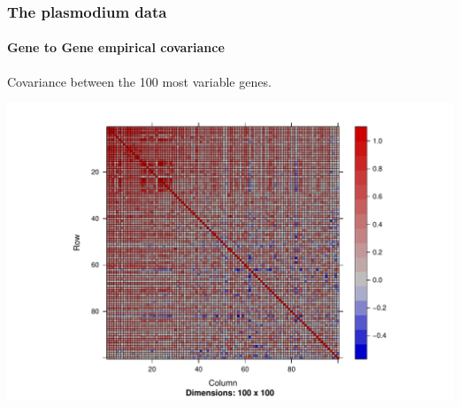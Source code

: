 \begin{frame}[fragile]
\frametitle{The plasmodium data}
\framesubtitle{Gene to Gene empirical covariance}

Covariance between the 100 most variable genes.

\begin{knitrout}\scriptsize
{}\color{fgcolor}\begin{kframe}
\begin{alltt}
 \hlkwb{<-} \hlstd{(}\hlstd{,var))[}\hlopt{:}\hlstd{]}
\hlstd{(}\hlstd{(}\hlstd{(} \hlstd{=}\hlstd{)}
\end{alltt}
\end{kframe}
\includegraphics[width=.8\textwidth]{figures/get_plasmodium_data_fig-1} 

\end{knitrout}
\end{frame}


